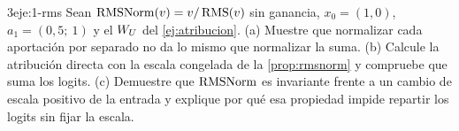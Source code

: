 \begin{ejercicio}{3}{eje:1-rms}
Sean $\operatorname{RMSNorm}(v)=v/\operatorname{RMS}(v)$ sin ganancia, $x_0=(1,0)$, $a_1=(0{,}5;\allowbreak\ 1)$ y el $W_{U}$ del \cref{ej:atribucion}. (a) Muestre que normalizar cada aportación por separado no da lo mismo que normalizar la suma. (b) Calcule la atribución directa con la escala congelada de la \cref{prop:rmsnorm} y compruebe que suma los logits. (c) Demuestre que $\operatorname{RMSNorm}$ es invariante frente a un cambio de escala positivo de la entrada y explique por qué esa propiedad impide repartir los logits sin fijar la escala.
\end{ejercicio}
